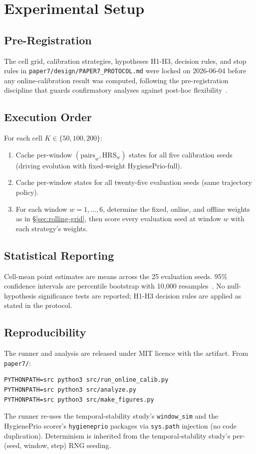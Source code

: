 \section{Experimental Setup}

\subsection{Pre-Registration}

The cell grid, calibration strategies, hypotheses H1-H3, decision rules,
and stop rules in \texttt{paper7/design/PAPER7\_PROTOCOL.md} were locked
on 2026-06-04 before any online-calibration result was computed,
following the pre-registration discipline that guards confirmatory
analyses against post-hoc flexibility~\cite{nosek2018preregistration}.

\subsection{Execution Order}

For each cell $K \in \{50, 100, 200\}$:
\begin{enumerate}
\item Cache per-window $(\text{pairs}_w, \text{HRS}_w)$ states for all
five calibration seeds (driving evolution with fixed-weight HygienePrio-full).
\item Cache per-window states for all twenty-five evaluation seeds
(same trajectory policy).
\item For each window $w = 1, \ldots, 6$, determine the
\textsf{fixed}, \textsf{online}, and \textsf{offline} weights as in
\S\ref{sec:rolling-grid}, then score every evaluation seed at window $w$ with each
strategy's weights.
\end{enumerate}

\subsection{Statistical Reporting}

Cell-mean point estimates are means across the 25 evaluation seeds.
95\% confidence intervals are percentile bootstrap with 10{,}000
resamples~\cite{efron1994introduction,diciccio1996bootstrap}. No
null-hypothesis significance
tests are reported; H1-H3 decision rules are applied as stated in the
protocol.

\subsection{Reproducibility}

The runner and analysis are released under MIT licence with the artifact.
From \texttt{paper7/}:
{\small\begin{verbatim}
PYTHONPATH=src python3 src/run_online_calib.py
PYTHONPATH=src python3 src/analyze.py
PYTHONPATH=src python3 src/make_figures.py
\end{verbatim}}
The runner re-uses the temporal-stability study's \texttt{window\_sim} and the HygienePrio scorer's
\texttt{hygieneprio} packages via \texttt{sys.path} injection (no
code duplication). Determinism is inherited from the temporal-stability study's per-(seed,
window, step) RNG seeding.

